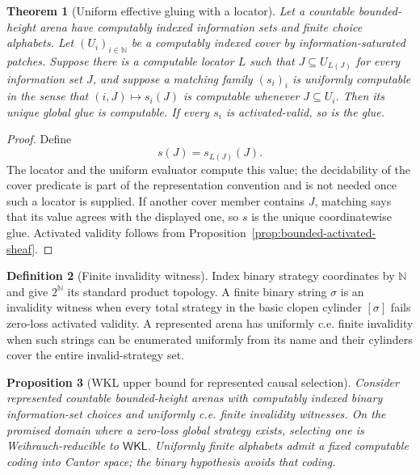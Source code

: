 \documentclass[11pt]{article}
\theoremstyle{plain}
\newtheorem{theorem}{Theorem}[section]
\newtheorem{proposition}[theorem]{Proposition}
\theoremstyle{definition}
\newtheorem{definition}[theorem]{Definition}
\theoremstyle{remark}
\newcommand{\N}{\mathbb{N}}
\begin{document}
\begin{theorem}[Uniform effective gluing with a locator]
\label{thm:uniform-effective-gluing}
Let a countable bounded-height arena have computably indexed information sets
and finite choice alphabets. Let $(U_i)_{i\in\N}$ be a computably indexed cover
by information-saturated patches. Suppose there is a computable locator
$L$ such that $J\subseteq U_{L(J)}$ for every information set $J$, and suppose
a matching family $(s_i)_i$ is uniformly computable in the sense that
$(i,J)\mapsto s_i(J)$ is computable whenever $J\subseteq U_i$. Then its unique
global glue is computable. If every $s_i$ is activated-valid, so is the glue.
\end{theorem}

\begin{proof}
Define
\[
s(J)=s_{L(J)}(J).
\]
The locator and the uniform evaluator compute this value; the decidability of
the cover predicate is part of the representation convention and is not needed
once such a locator is supplied. If another cover
member contains $J$, matching says that its value agrees with the displayed
one, so $s$ is the unique coordinatewise glue. Activated validity follows from
Proposition~\ref{prop:bounded-activated-sheaf}.
\end{proof}


\begin{definition}[Finite invalidity witness]
\label{def:finite-invalidity-witness}
Index binary strategy coordinates by $\N$ and give $2^\N$ its standard product
topology. A finite binary string $\sigma$ is an invalidity witness when every
total strategy in the basic clopen cylinder $[\sigma]$ fails zero-loss activated
validity. A represented arena has uniformly c.e. finite invalidity when such
strings can be enumerated uniformly from its name and their cylinders cover the
entire invalid-strategy set.
\end{definition}

\begin{proposition}[WKL upper bound for represented causal selection]
\label{prop:causal-WKL-upper}
Consider represented countable bounded-height arenas with computably indexed
binary information-set choices and uniformly c.e. finite invalidity witnesses.
On the promised domain where a zero-loss global strategy exists, selecting one
is Weihrauch-reducible to $\mathsf{WKL}$. Uniformly finite alphabets admit a
fixed computable coding into Cantor space; the binary hypothesis avoids that
coding.
\end{proposition}
\end{document}
